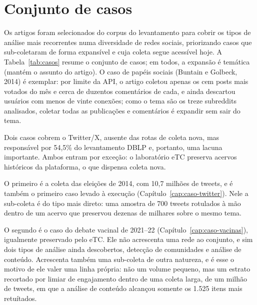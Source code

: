 \section{Conjunto de casos}
\label{sec:casos}

Os artigos foram selecionados do corpus do levantamento para cobrir os tipos de
análise mais recorrentes numa diversidade de redes sociais, priorizando casos
que sub-coletaram de forma expansível e cuja coleta segue acessível hoje. A
Tabela~\ref{tab:casos} resume o conjunto de casos; em todos, a expansão é temática
(mantém o assunto do artigo). O caso de papéis sociais (Buntain e Golbeck, 2014) é
exemplar: por limite da API, o artigo coletou apenas os cem posts mais votados do
mês e cerca de duzentos comentários de cada, e ainda descartou usuários com menos
de vinte conexões; como o tema são os treze subreddits analisados, coletar todas
as publicações e comentários é expandir sem sair do tema.

Dois casos cobrem o Twitter/X, ausente das rotas de coleta nova, mas responsável
por 54,5\% do levantamento DBLP e, portanto, uma lacuna importante. Ambos entram
por exceção: o laboratório eTC preserva acervos históricos da plataforma, o que
dispensa coleta nova.

O primeiro é a coleta das eleições de 2014, com 10,7 milhões de tweets, e é também
o primeiro caso levado à execução (Capítulo~\ref{cap:caso-twitter}). Nele a
sub-coleta é do tipo mais direto: uma amostra de 700 tweets rotulados à mão dentro
de um acervo que preservou dezenas de milhares sobre o mesmo tema.

O segundo é o caso do debate vacinal de 2021--22
(Capítulo~\ref{cap:caso-vacinas}), igualmente preservado pelo eTC. Ele não
acrescenta uma rede ao conjunto, e sim dois tipos de análise ainda descobertos,
detecção de comunidades e análise de conteúdo. Acrescenta também uma sub-coleta de
outra natureza, e é esse o motivo de ele valer uma linha própria: não um volume
pequeno, mas um estrato recortado por limiar de engajamento dentro de uma coleta
larga, de um milhão de tweets, em que a análise de conteúdo alcançou somente os
1.525 itens mais retuítados.


